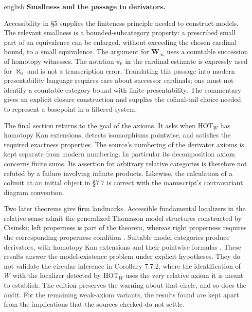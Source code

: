 \begin{otherlanguage*}{english}
\medskip\noindent\textbf{Smallness and the passage to derivators.}

Accessibility in \S5 supplies the finiteness principle needed to construct models. The relevant smallness is a bounded-subcategory property: a prescribed small part of an equivalence can be enlarged, without exceeding the chosen cardinal bound, to a small equivalence. The argument for $\mathbf W_\infty$ uses a countable succession of homotopy witnesses. The notation $\pi_0$ in the cardinal estimate is expressly used for $\aleph_0$ and is not a transcription error. Translating this passage into modern presentability language requires care about successor cardinals; one must not identify a countable-category bound with finite presentability. The commentary gives an explicit closure construction and supplies the cofinal-tail choice needed to represent a basepoint in a filtered system.

The final section returns to the goal of the axioms. It asks when $\mathrm{HOT}_W$ has homotopy Kan extensions, detects isomorphisms pointwise, and satisfies the required exactness properties. The source's numbering of the derivator axioms is kept separate from modern numbering. In particular its decomposition axiom concerns finite sums. Its assertion for arbitrary relative categories is therefore not refuted by a failure involving infinite products. Likewise, the calculation of a colimit at an initial object in \S7.7 is correct with the manuscript's contravariant diagram convention.

Two later theorems give firm landmarks. Accessible fundamental localizers in the relative sense admit the generalized Thomason model structures constructed by Cisinski; left properness is part of the theorem, whereas right properness requires the corresponding properness condition \citep[Theorem 5.2.15]{Cisinski2006}. Suitable model categories produce derivators, with homotopy Kan extensions and their pointwise formulas \citep{Cisinski2003,Groth2013}. These results answer the model-existence problem under explicit hypotheses. They do not validate the circular inference in Corollary 7.7.2, where the identification of $W$ with the localizer detected by $\mathrm{HOT}_W$ uses the very relative axiom it is meant to establish. The edition preserves the warning about that circle, and so does the audit. For the remaining weak-axiom variants, the results found are kept apart from the implications that the sources checked do not settle.

\end{otherlanguage*}
